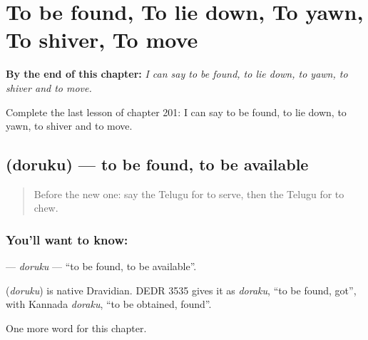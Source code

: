 
\chapter{To be found, To lie down, To yawn, To shiver, To move}
\label{ch:te-to-be-found-to-lie-down-to-yawn-to-shiver-to-move}

\begin{chapteropening}
\textbf{By the end of this chapter:} \emph{I can say to be found, to lie down, to yawn, to shiver and to move.}

Complete the last lesson of chapter 201: I can say to be found, to lie down, to yawn, to shiver and to move.
\end{chapteropening}

\section[\texorpdfstring{\te{దొరుకు} (doruku)}{దొరుకు (doruku)}]{ (doruku) — to be found, to be available}

\label{lesson:TE-C201-doruku}



\begin{quote}
Before the new one: say the Telugu for to serve, then the Telugu for to chew.
\end{quote}

\subsection*{You'll want to know: }
\textbf{} — \emph{doruku} — \textquotedblleft{}to be found, to be available\textquotedblright{}.

\begin{cousinweb}
\textbf{} (\emph{doruku}) is native Dravidian. DEDR 3535 gives it as \emph{doraku}, \textquotedblleft{}to be found, got\textquotedblright{}, with Kannada \emph{doraku}, \textquotedblleft{}to be obtained, found\textquotedblright{}.
\end{cousinweb}

\begin{grammarlens}[title={What you've built}]
One more word for this chapter.
\end{grammarlens}

